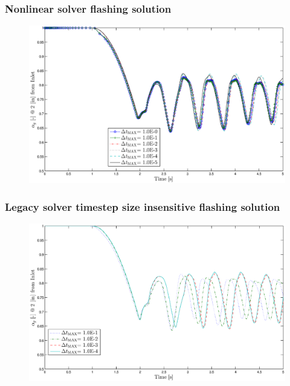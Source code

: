 \documentclass[compress,xcolor=table]{beamer}
\begin{document}
\begin{frame}
\frametitle{Nonlinear solver flashing solution}

\begin{figure}[h!t]
\centering
\includegraphics[width=.94\textwidth]{images/nl_flashing_al_2in.eps}
\end{figure}

\end{frame}
\begin{frame}
\frametitle{Legacy solver timestep size insensitive flashing solution}

\begin{figure}[h!t]
\centering
\includegraphics[width=.94\textwidth]{images/cobra_flashing_1em1_1em4.eps}
\end{figure}

\end{frame}
\end{document}
